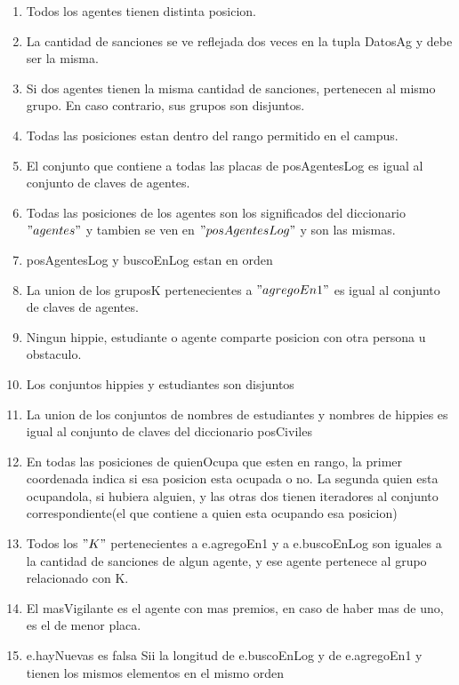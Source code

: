 \hspace*{\disSubSubSecMargen}
\begin{enumerate}
\setlength{\itemindent}{3em}
  \item Todos los agentes tienen distinta posicion.
  \item La cantidad de sanciones se ve reflejada dos veces en la tupla DatosAg y debe ser la misma.
  \item Si dos agentes tienen la misma cantidad de sanciones, pertenecen al mismo grupo. En caso contrario, sus grupos son disjuntos.
  \item Todas las posiciones estan dentro del rango permitido en el campus.
  \item El conjunto que contiene a todas las placas de posAgentesLog es igual al conjunto de claves de agentes. 
  \item Todas las posiciones de los agentes son los significados del diccionario $"agentes"$ y tambien se ven en $"posAgentesLog"$ y son las mismas.
    \item posAgentesLog y buscoEnLog estan en orden

  \item La union de los gruposK pertenecientes a $"agregoEn1"$ es igual al conjunto de claves de agentes.
  \item Ningun hippie, estudiante o agente comparte posicion con otra persona u obstaculo.
    \item Los conjuntos hippies y estudiantes son disjuntos

  \item La union de los conjuntos de nombres de estudiantes y nombres de hippies es igual al conjunto de claves del diccionario posCiviles
  \item En todas las posiciones de quienOcupa que esten en rango, la primer coordenada indica si esa posicion esta ocupada o no. La segunda quien esta ocupandola, si hubiera alguien, y las otras dos tienen iteradores al conjunto correspondiente(el que contiene a quien esta ocupando esa posicion)
  \item Todos los $"K"$ pertenecientes a e.agregoEn1 y a e.buscoEnLog son iguales a la cantidad de sanciones de algun agente, y ese agente pertenece al grupo relacionado con K.
  \item El masVigilante es el agente con mas premios, en caso de haber mas de uno, es el de menor placa.
  \item e.hayNuevas es falsa Sii la longitud de e.buscoEnLog y de e.agregoEn1 y tienen los mismos elementos en el mismo orden
  
\end{enumerate}

